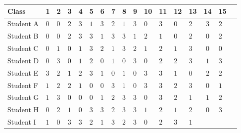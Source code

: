 \documentclass[11pt]{article}
\begin{document}
\begin{center}
\begin{table}[h]

\small
\begin{tabular}{|a|l|l|l|l|l|l|l|l|l|l|l|l|l|c|l|l|}
 \hline
Class & 1 & 2 & 3 & 4 & 5 & 6 & 7 & 8
& 9 & 10 & 11 & 12 & 13 & 14 & 15 \\ \hline
\hline
Student A & $0$ & $0$ & $2$ & $3$ & $1$ & $3$
& $2$ & $1$ & $3$ & $0$ & $3$ & $0$ & $2$
& $3$ & $2$ \\ \hline
Student B & $0$ & $0$ & $2$ & $3$ & $3$ & $1$
& $3$ & $3$ & $1$ & $2$ & $1$ & $0$ & $2$
& $0$ & $2$ \\ \hline
Student C & $0$ & $1$ & $0$ & $1$ & $3$ & $2$
& $1$ & $3$ & $2$ & $1$ & $2$ & $1$ & $3$
& $0$ & $0$ \\ \hline
Student D & $0$ & $3$ & $0$ & $1$ & $2$ & $0$
& $1$ & $0$ & $3$ & $0$ & $2$ & $2$ & $3$
& $1$ & $3$ \\ \hline
Student E & $3$ & $2$ & $1$ & $2$ & $3$ & $1$
& $0$ & $1$ & $0$ & $3$ & $3$ & $1$ & $0$
& $2$ & $2$ \\ \hline
Student F & $1$ & $2$ & $2$ & $1$ & $0$ & $0$
& $3$ & $1$ & $0$ & $3$ & $3$ & $2$ & $3$
& $0$ & $1$ \\ \hline
Student G & $1$ & $3$ & $0$ & $0$ & $0$ & $1$
& $2$ & $3$ & $3$ & $0$ & $3$ & $2$ & $1$
& $1$ & $2$ \\ \hline
Student H & $0$ & $2$ & $1$ & $0$ & $3$ & $3$
& $2$ & $3$ & $3$ & $1$ & $2$ & $1$ & $2$
& $0$ & $3$ \\ \hline
Student I & $1$ & $0$ & $3$ & $3$ & $2$ & $1$
& $3$ & $2$ & $3$ & $0$ & $2$ & $3$ & $1$

\end{tabular}
\end{table}
\end{center}
\end{document}
